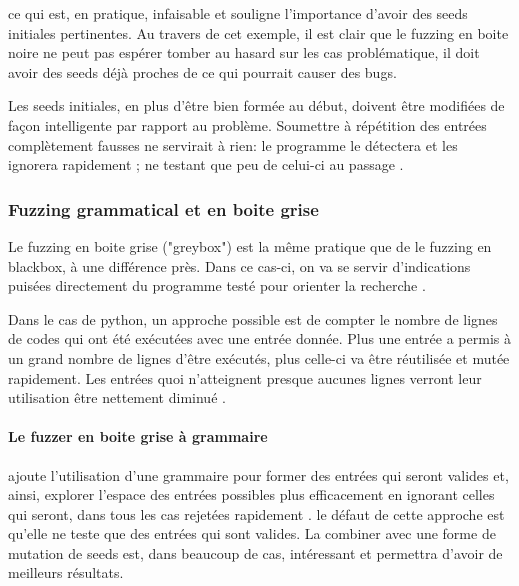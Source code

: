 \documentclass[a4paper]{report}
\begin{document}
ce qui est, en pratique, infaisable et souligne l'importance d'avoir des seeds initiales pertinentes.
Au travers de cet exemple, il est clair que le fuzzing en boite noire ne peut pas espérer tomber au hasard sur les cas problématique, il doit avoir des seeds déjà proches de ce qui pourrait causer des bugs.


Les seeds initiales, en plus d'être bien formée au début, doivent être modifiées de façon intelligente par rapport au problème.
Soumettre à répétition des entrées complètement fausses ne servirait à rien: le programme le détectera et les ignorera rapidement ; ne testant que peu de celui-ci au passage \cite{Godefroid2020}.


\subsubsection{Fuzzing grammatical et en boite grise}

Le fuzzing en boite grise ("greybox") est la même pratique que de le fuzzing en blackbox, à une différence près.
Dans ce cas-ci, on va se servir d’indications puisées directement du programme testé pour orienter la recherche \cite{fuzzingbook2022:GreyboxFuzzer}.

Dans le cas de python, un approche possible est de compter le nombre de lignes de codes qui ont été exécutées avec une entrée donnée.
Plus une entrée a permis à un grand nombre de lignes d’être exécutés, plus celle-ci va être réutilisée et mutée rapidement.
Les entrées quoi n'atteignent presque aucunes lignes verront leur utilisation être nettement diminué \cite{fuzzingbook2022:GreyboxFuzzer}.

\paragraph{Le fuzzer en boite grise à grammaire} ajoute l'utilisation d'une grammaire pour former des entrées qui seront valides et, ainsi, explorer l'espace des entrées possibles plus efficacement en ignorant celles qui seront, dans tous les cas rejetées rapidement \cite{fuzzingbook2022:GreyboxGrammarFuzzer}.
le défaut de cette approche est qu'elle ne teste que des entrées qui sont valides.
La combiner avec une forme de mutation de seeds est, dans beaucoup de cas, intéressant et permettra d'avoir de meilleurs résultats.
\end{document}
